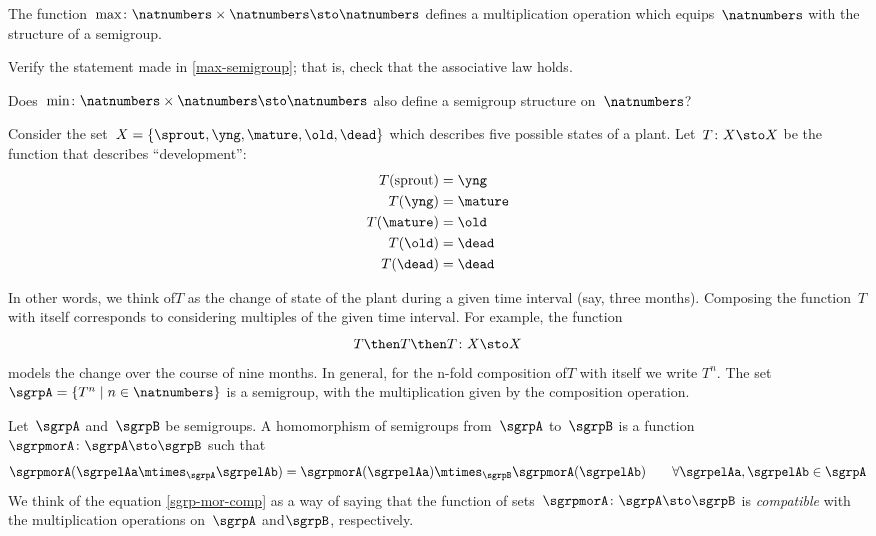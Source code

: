 \begin{example}
\label{max-semigroup}
The function~$\max \colon \natnumbers \times \natnumbers \sto \natnumbers$ defines a multiplication operation which equips~$\natnumbers$ with the structure of a semigroup.
\end{example}

\begin{exercise}
\label{ex:max-semigroup}
Verify the statement made in \cref{max-semigroup}; that is, check that the associative law holds.

Does~$\min \colon \natnumbers \times \natnumbers \sto \natnumbers$ also define a semigroup structure on~$\natnumbers$?
\end{exercise}
\begin{solution}
\end{solution}


\begin{example}
\label{plant-trafo-semigroup}
Consider the set~$X = \{ \sprout, \yng, \mature, \old, \dead \}$ which describes five possible states of a plant. Let~$T \colon X \sto X$ be the function that describes ``development'':
\begin{align*}
T(\text{sprout}) &=  \yng \\
T(\yng) &=  \mature \\
T(\mature) &=  \old \\
T( \old) &= \dead \\
T (\dead) &= \dead
\end{align*}

In other words, we think of$T$ as the change of state of the plant during a given time interval (say, three months).
Composing the function~$T$ with itself corresponds to considering multiples of the given time interval. For example, the function
\begin{equation*}
T \then T \then T \colon X \sto X
\end{equation*}
models the change over the course of nine months. In general, for the n-fold composition of$T$ with itself we write $T^n$.
The set~$\sgrpA = \{ T^n \mid n \in \natnumbers \}$ is a semigroup, with the multiplication given by the composition operation.
\end{example}

\begin{definition}
\label{def:semigroup-mor}
Let~$\sgrpA$ and~$\sgrpB$ be semigroups. A homomorphism of semigroups from~$\sgrpA$ to~$\sgrpB$ is a function~$\sgrpmorA\colon \sgrpA \sto \sgrpB$ such that
\begin{equation}
\label{sgrp-mor-comp}
\sgrpmorA(\sgrpelAa \mtimes_{\sgrpA} \sgrpelAb) = \sgrpmorA (\sgrpelAa) \mtimes_{\sgrpB} \sgrpmorA(\sgrpelAb) \quad \quad \forall \sgrpelAa, \sgrpelAb \in \sgrpA
\end{equation}
We think of the equation \cref{sgrp-mor-comp} as a way of saying that the function of sets~$\sgrpmorA\colon \sgrpA \sto \sgrpB$  is \emph{compatible} with the multiplication operations on~$\sgrpA$ and$\sgrpB$, respectively.
\end{definition}


